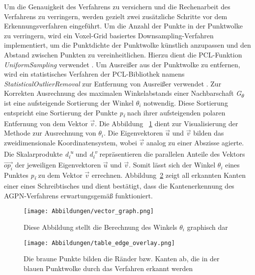 Um die Genauigkeit des Verfahrens zu versichern und die Rechenarbeit des Verfahrens zu verringern, werden gezielt zwei zusätzliche Schritte vor dem Erkennungsverfahren eingeführt. Um die Anzahl der Punkte in der Punktwolke zu verringern, wird ein Voxel-Grid basiertes Downsampling-Verfahren implementiert, um die Punktdichte der Punktwolke künstlich anzupassen und den Abstand zwischen Punkten zu vereinheitlichen. Hierzu dient die PCL-Funktion \textit{UniformSampling} verwendet \autocite{noauthor_point_2023}. Um Ausreißer aus der Punktwolke zu entfernen, wird ein statistisches Verfahren der PCL-Bibliothek namens \textit{StatisticalOutlierRemoval} zur Entfernung von Ausreißer verwendet \autocite{rusu_towards_2008}. Zur Korrekten Ausrechnung des maximalen Winkelabstands einer Nachbarschaft \textit{G\textsubscript{$\theta$}} ist eine aufsteigende Sortierung der Winkel \textit{$\theta_i$} notwendig. Diese Sortierung entspricht eine Sortierung der Punkte \textit{p\textsubscript{i}} nach ihrer aufsteigenden polaren Entfernung von dem Vektor $\vec{v}$. Die Abbildung ~\ref{vector_graph} dient zur Visualisierung der Methode zur Ausrechnung von $\theta_i$. Die Eigenvektoren $\vec{u}$ und $\vec{v}$ bilden das zweidimensionale Koordinatensystem, wobei $\vec{v}$ analog zu einer Abszisse agierte. Die Skalarprodukte \textit{d\textsubscript{i}\textsuperscript{u}} und \textit{d\textsubscript{i}\textsuperscript{v}} repräsentieren die parallelen Anteile des Vektors $\vec{{op}_i}$ der jeweiligen Eigenvektoren $\vec{u}$ und $\vec{v}$. Somit lässt sich der Winkel $\theta_i$ eines Punktes \textit{p\textsubscript{i}} zu dem Vektor $\vec{v}$ errechnen. Abbildung~\ref{edge_points_table} zeigt all erkannten Kanten einer eines Schreibtisches und dient bestätigt, dass die Kantenerkennung des AGPN-Verfahrens erwartungsgemäß funktioniert.

\begin{figure}[h]
	\texttt{[image: Abbildungen/vector\_graph.png]}
	\centering
	\caption{Diese Abbildung stellt die Berechnung des Winkels $\theta_i$ graphisch dar}
	\label{vector_graph}
\end{figure}

\begin{figure}[h]
	\texttt{[image: Abbildungen/table\_edge\_overlay.png]}
	\centering
	\caption{Die braune Punkte bilden die Ränder bzw. Kanten ab, die in der blauen Punktwolke durch das Verfahren erkannt werden}
	\label{edge_points_table}
\end{figure}

